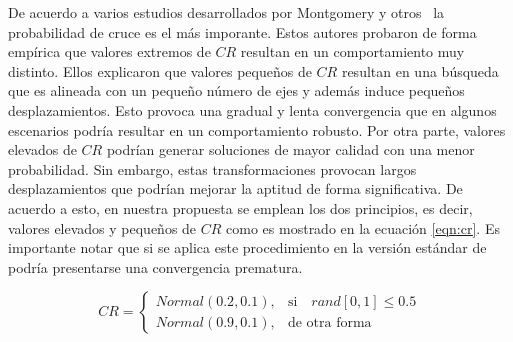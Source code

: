 %
De acuerdo a varios estudios desarrollados por Montgomery y otros~\cite{montgomery2010analysis} la probabilidad de cruce es el más imporante.
%
Estos autores probaron de forma empírica que valores extremos de $CR$ resultan en un comportamiento muy distinto.
%
Ellos explicaron que valores pequeños de $CR$ resultan en una búsqueda que es alineada con un pequeño número de ejes y además induce pequeños desplazamientos.
%
Esto provoca una gradual y lenta convergencia que en algunos escenarios podría resultar en un comportamiento robusto.
%
Por otra parte, valores elevados de $CR$ podrían generar soluciones de mayor calidad con una menor probabilidad.
%
Sin embargo, estas transformaciones provocan largos desplazamientos que podrían mejorar la aptitud de forma significativa.
%
De acuerdo a esto, en nuestra propuesta se emplean los dos principios, es decir, valores elevados y pequeños de $CR$ como es mostrado en la ecuación \ref{eqn:cr}.
%
Es importante notar que si se aplica este procedimiento en la versión estándar de \DE{} podría presentarse una convergencia prematura.

\begin{equation} \label{eqn:cr}
CR = 
\begin{cases}
     Normal(0.2, 0.1),& \text{si} \quad rand[0,1] \leq 0.5  \\
     Normal(0.9, 0.1),              & \text{de otra forma}
\end{cases}
\end{equation}

